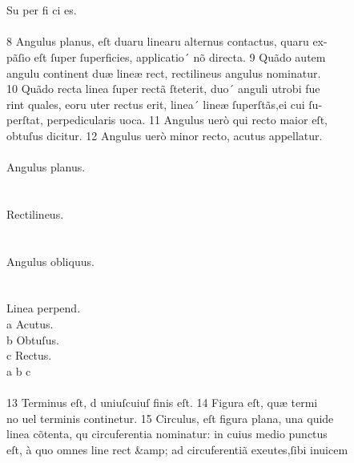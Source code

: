 \begin{typeLatin}
\\
\\
Su per fi ci es.\\
\\
8 Angulus planus, eſt duar\bs\tld{}u linear\bs\tld{}u alternus contactus, quar\bs\tld{}u ex- \\
pãſio eſt ſuper ſuperficies, applicatio´ nõ directa. 9 Quãdo autem \\
angul\bs\tld{}u continent duæ lineæ rect, rectilineus angulus nominatur. \\
10 Quãdo recta linea ſuper rectã ſteterit, duo´ anguli utrobi fue \\
rint quales, eor\bs\tld{}u uter rectus erit, linea´ lineæ ſuperſtãs,\lwr ei cui ſu- \\
perſtat, perp\bs\tld{}edicularis uoca. 11 Angulus uerò qui recto maior eſt, \\
obtuſus dicitur. 12 Angulus uerò minor recto, acutus appellatur.\\
\\
Angulus planus.\\
\\
\\
Rectilineus.\\
\\
\\
Angulus obliquus.\\
\\
\\
Linea perpend.\\
a Acutus.\\
b Obtuſus.\\
c Rectus.\\
a b c\\
\\
13 Terminus eſt, d uniuſcuiuſ finis eſt. 14 Figura eſt, quæ termi \\
no uel terminis continetur. 15 Circulus, eſt figura plana, una quid\bs\tld{}e \\
linea cõtenta, qu circ\bs\tld{}uferentia nominatur: in cuius medio punctus \\
eſt, à quo omnes line rect &amp; ad circ\bs\tld{}uferentiã exe\bs\tld{}utes,\lwr ſibi inuicem \\
\end{typeLatin}

